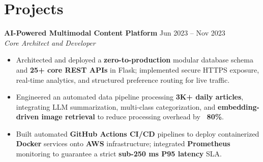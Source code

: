 \documentclass[10pt,a4paper]{article}
\newcommand{\resumeSubheading}[4]{
    \textbf{#1} \hfill #2 \\
    \textit{#3} \hfill \textit{#4}
}
\begin{document}
\section{Projects}
\resumeSubheading
{AI-Powered Multimodal Content Platform}
{Jun 2023 -- Nov 2023}
{Core Architect and Developer}
{}
\vspace{-2pt}
\begin{itemize}[leftmargin=*,
itemsep=1pt,
topsep=0pt,
parsep=1pt,
partopsep=0pt]
\item Architected and deployed a \textbf{zero-to-production} modular database schema and \textbf{25+ core REST APIs} in Flask; implemented secure HTTPS exposure, real-time analytics, and structured preference routing for live traffic.

\item Engineered an automated data pipeline processing \textbf{3K+ daily articles}, integrating LLM summarization, multi-class categorization, and \textbf{embedding-driven image retrieval} to reduce processing overhead by \textbf{~80\%}.

\item Built automated \textbf{GitHub Actions CI/CD} pipelines to deploy containerized \textbf{Docker} services onto \textbf{AWS} infrastructure; integrated \textbf{Prometheus} monitoring to guarantee a strict \textbf{sub-250 ms P95 latency} SLA.







\end{itemize}
\end{document}
